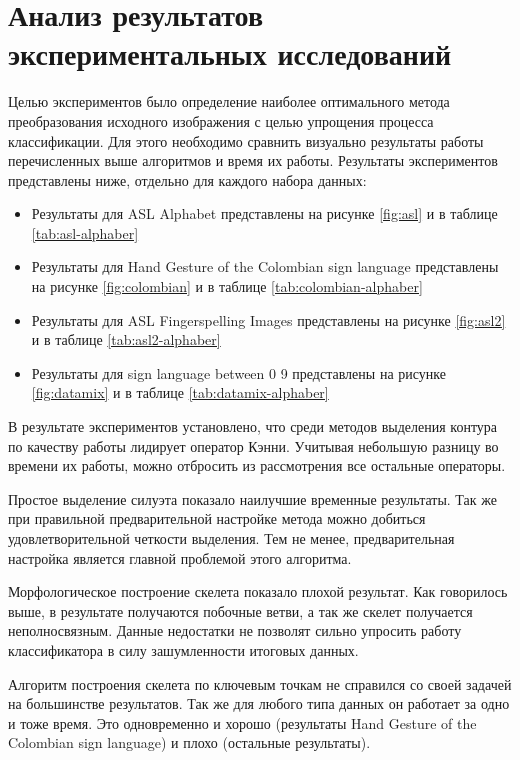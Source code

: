 \section{Анализ результатов экспериментальных исследований}
\label{sec:Results}

Целью экспериментов было определение наиболее оптимального метода преобразования исходного изображения с целью упрощения процесса классификации. Для этого необходимо сравнить визуально результаты работы перечисленных выше алгоритмов и время их работы. Результаты экспериментов представлены ниже, отдельно для каждого набора данных:

\begin{itemize}
	\item Результаты для ASL Alphabet представлены на рисунке \ref{fig:asl} и в таблице \ref{tab:asl-alphaber}
	\item Результаты для Hand Gesture of the Colombian sign language представлены на рисунке \ref{fig:colombian} и в таблице \ref{tab:colombian-alphaber}
	\item Результаты для ASL Fingerspelling Images представлены на рисунке \ref{fig:asl2} и в таблице \ref{tab:asl2-alphaber}
	\item Результаты для sign language between 0 9 представлены на рисунке \ref{fig:datamix} и в таблице \ref{tab:datamix-alphaber}
\end{itemize}



В результате экспериментов установлено, что среди методов выделения контура по качеству работы лидирует оператор Кэнни. Учитывая небольшую разницу во времени их работы, можно отбросить из рассмотрения все остальные операторы.

Простое выделение силуэта показало наилучшие временные результаты. Так же при правильной предварительной настройке метода можно добиться удовлетворительной четкости выделения. Тем не менее, предварительная настройка является главной проблемой этого алгоритма.

Морфологическое построение скелета показало плохой результат. Как говорилось выше, в результате получаются побочные ветви, а так же скелет получается неполносвязным. Данные недостатки не позволят сильно упросить работу классификатора в силу зашумленности итоговых данных.

Алгоритм построения скелета по ключевым точкам не справился со своей задачей на большинстве результатов. Так же для любого типа данных он работает за одно и тоже время. Это одновременно и хорошо (результаты Hand Gesture of the Colombian sign language) и плохо (остальные результаты).